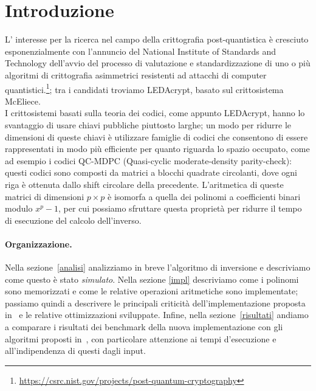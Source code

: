\section{Introduzione}
L' interesse per la ricerca nel campo della crittografia post-quantistica è cresciuto esponenzialmente
con l'annuncio del National Institute of Standards and Technology dell'avvio del processo di valutazione
e standardizzazione di uno o più algoritmi di crittografia asimmetrici resistenti ad attacchi di computer 
quantistici.\footnote{\href{https://csrc.nist.gov/projects/post-quantum-cryptography}{https://csrc.nist.gov/projects/post-quantum-cryptography}};
tra i candidati troviamo LEDAcrypt\cite{baldi2019ledacrypt, ledaKEM}, basato sul crittosistema McEliece.\\
I crittosistemi basati sulla teoria dei codici, come appunto LEDAcrypt, hanno lo svantaggio di usare chiavi pubbliche piuttosto larghe; un modo per ridurre le dimensioni
di queste chiavi è utilizzare famiglie di codici che consentono di essere rappresentati in modo più efficiente per quanto riguarda lo spazio occupato,
come ad esempio i codici QC-MDPC (Quasi-cyclic moderate-density parity-check): questi codici sono composti da matrici a blocchi quadrate circolanti,
dove ogni riga è ottenuta dallo shift circolare della precedente. L'aritmetica di queste matrici di dimensioni $p \times p$ è isomorfa a quella dei polinomi
a coefficienti binari modulo $x^p-1$, per cui possiamo sfruttare questa proprietà per ridurre il tempo di esecuzione del calcolo dell'inverso.
\paragraph*{Organizzazione.}
Nella sezione~\ref{analisi} analizziamo in breve l'algoritmo di inversione e descriviamo come questo è stato \textit{simulato}. Nella sezione
\ref{impl} descriviamo come i polinomi sono memorizzati e come le relative operazioni aritmetiche sono implementate; passiamo quindi a descrivere
le principali criticità dell'implementazione proposta in~\cite{benchmark} e le relative ottimizzazioni sviluppate. Infine, nella sezione~\ref{risultati}
andiamo a comparare i risultati dei benchmark della nuova implementazione con gli algoritmi proposti in~\cite{barenghi2020comprehensive},
con particolare attenzione ai tempi d'esecuzione e all'indipendenza di questi dagli input.
